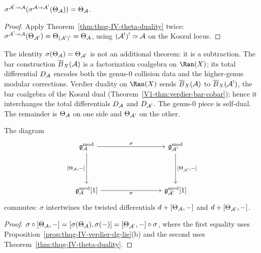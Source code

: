 \begin{corollary}
$\sigma^{\mathcal{A}^! \to \mathcal{A}}(\sigma^{\mathcal{A} \to \mathcal{A}^!}(\Theta_{\mathcal{A}}))
= \Theta_{\mathcal{A}}$.
\end{corollary}

\begin{proof}
Apply Theorem~\ref{thm:thqg-IV-theta-duality} twice:
$\sigma^{\mathcal{A}^! \to \mathcal{A}}(\Theta_{\mathcal{A}^!})
= \Theta_{(\mathcal{A}^!)^!} = \Theta_{\mathcal{A}}$,
using $(\mathcal{A}^!)^! \simeq \mathcal{A}$ on the Koszul locus.
\end{proof}

\begin{remark}[Inevitability]
The identity $\sigma(\Theta_{\mathcal{A}}) = \Theta_{\mathcal{A}^!}$ is not an additional
theorem: it is a subtraction. The bar construction
$\overline{B}_X(\mathcal{A})$ is a factorization coalgebra on $\Ran(X)$; its total
differential $D_{\mathcal{A}}$ encodes both the genus-$0$ collision data and the
higher-genus modular corrections. Verdier duality on $\Ran(X)$
sends $\overline{B}_X(\mathcal{A})$ to $\overline{B}_X(\mathcal{A}^!)$, the bar coalgebra
of the Koszul dual
(Theorem~\ref*{V1-thm:verdier-bar-cobar}); hence it interchanges the
total differentials $D_{\mathcal{A}}$ and $D_{\mathcal{A}^!}$.
The genus-$0$ piece is self-dual. The remainder is
$\Theta_{\mathcal{A}}$ on one side and $\Theta_{\mathcal{A}^!}$ on the other.
\end{remark}

\begin{proposition}
\label{prop:thqg-IV-fundamental-diagram}
The diagram
\begin{equation}%
\begin{tikzcd}[column sep=3cm, row sep=1.5cm]
\gAmod \arrow[r, "\sigma"] \arrow[d, "{[\Theta_\cA, -]}"']
& \mathfrak{g}_{\cA^!}^{\mathrm{mod}} \arrow[d, "{[\Theta_{\cA^!}, -]}"] \\
\gAmod{}[1] \arrow[r, "\sigma"']
& \mathfrak{g}_{\cA^!}^{\mathrm{mod}}[1]
\end{tikzcd}
\end{equation}
commutes: $\sigma$ intertwines the twisted differentials
$d + [\Theta_{\mathcal{A}}, -]$ and $d + [\Theta_{\mathcal{A}^!}, -]$.
\end{proposition}

\begin{proof}
$\sigma \circ [\Theta_{\mathcal{A}}, -]
= [\sigma(\Theta_{\mathcal{A}}), \sigma(-)]
= [\Theta_{\mathcal{A}^!}, -] \circ \sigma$,
where the first equality uses Proposition~\ref{prop:thqg-IV-verdier-dg-lie}(b)
and the second uses Theorem~\ref{thm:thqg-IV-theta-duality}.
\end{proof}

